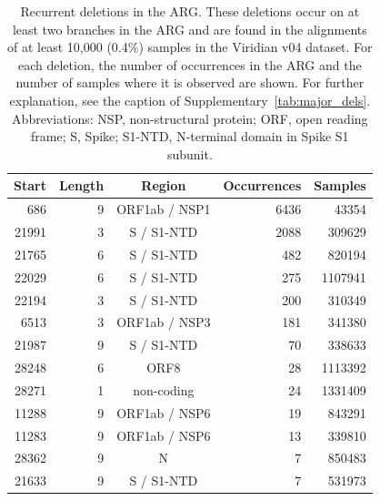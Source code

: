 \documentclass[12pt]{article}
\newcommand{\siref}[1]{Supplementary~\ref{#1}}
\begin{document}
\begin{table}
\centering
\caption{
Recurrent deletions in the ARG.
These deletions occur on at least two branches in the ARG and
are found in the alignments of at least 10,000 (0.4\%) samples
in the Viridian v04 dataset.
For each deletion, the number of occurrences in the ARG and
the number of samples where it is observed are shown.
For further explanation,
see the caption of \siref{tab:major_dels}.
Abbreviations:
NSP, non-structural protein;
ORF, open reading frame;
S, Spike;
S1-NTD, N-terminal domain in Spike S1 subunit.
}
\label{tab:rec_dels}
\begin{tabular}{rrcrr}
\toprule
Start & Length & Region & Occurrences & Samples\\
\midrule
686 & 9 & ORF1ab / NSP1 & 6436 & 43354\\
21991 & 3 & S / S1-NTD & 2088 & 309629\\
21765 & 6 & S / S1-NTD & 482 & 820194\\
22029 & 6 & S / S1-NTD & 275 & 1107941\\
22194 & 3 & S / S1-NTD & 200 & 310349\\
6513 & 3 & ORF1ab / NSP3 & 181 & 341380\\
21987 & 9 & S / S1-NTD & 70 & 338633\\
28248 & 6 & ORF8 & 28 & 1113392\\
28271 & 1 & non-coding & 24 & 1331409\\
11288 & 9 & ORF1ab / NSP6 & 19 & 843291\\
11283 & 9 & ORF1ab / NSP6 & 13 & 339810\\
28362 & 9 & N & 7 & 850483\\
21633 & 9 & S / S1-NTD & 7 & 531973\\
\bottomrule
\end{tabular}
\end{table}

\clearpage %

\end{document}
